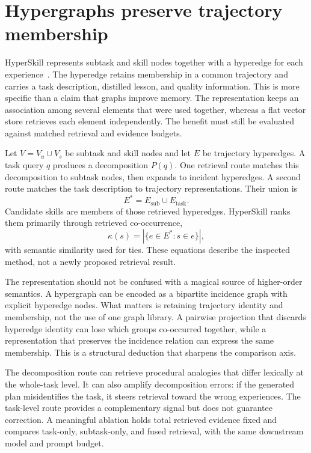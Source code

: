 \section{Hypergraphs preserve trajectory membership}\label{sec:C15:hypergraph}
HyperSkill represents subtask and skill nodes together with a hyperedge for each experience~\cite{xu2026hyperskill}. The hyperedge retains membership in a common trajectory and carries a task description, distilled lesson, and quality information. This is more specific than a claim that graphs improve memory. The representation keeps an association among several elements that were used together, whereas a flat vector store retrieves each element independently. The benefit must still be evaluated against matched retrieval and evidence budgets.

Let $V=V_u\cup V_s$ be subtask and skill nodes and let $E$ be trajectory hyperedges. A task query $q$ produces a decomposition $P(q)$. One retrieval route matches this decomposition to subtask nodes, then expands to incident hyperedges. A second route matches the task description to trajectory representations. Their union is
\begin{equation}
 E^*=E_{\mathrm{sub}}\cup E_{\mathrm{task}}.
\end{equation}
Candidate skills are members of those retrieved hyperedges. HyperSkill ranks them primarily through retrieved co-occurrence,
\begin{equation}
 \kappa(s)=|\{e\in E^*:s\in e\}|,
\end{equation}
with semantic similarity used for ties. These equations describe the inspected method, not a newly proposed retrieval result.

The representation should not be confused with a magical source of higher-order semantics. A hypergraph can be encoded as a bipartite incidence graph with explicit hyperedge nodes. What matters is retaining trajectory identity and membership, not the use of one graph library. A pairwise projection that discards hyperedge identity can lose which groups co-occurred together, while a representation that preserves the incidence relation can express the same membership. This is a structural deduction that sharpens the comparison axis.

The decomposition route can retrieve procedural analogies that differ lexically at the whole-task level. It can also amplify decomposition errors: if the generated plan misidentifies the task, it steers retrieval toward the wrong experiences. The task-level route provides a complementary signal but does not guarantee correction. A meaningful ablation holds total retrieved evidence fixed and compares task-only, subtask-only, and fused retrieval, with the same downstream model and prompt budget.

